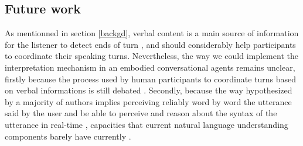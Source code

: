 \subsection{Future work}

As mentionned in section \ref{backgd}, verbal content is a main source of information for the listener to detect ends of turn \cite{de_ruiter_projecting_2006}, and should considerably help participants to coordinate their speaking turns. Nevertheless, the way we could implement the interpretation mechanism in an embodied conversational agents remains unclear, firstly because the process used by human participants to coordinate turns based on verbal informations is still debated \citep{heldner_pauses_2010,magyari_prediction_2012,riest_anticipation_2015}. Secondly, because the way hypothesized by a majority of authors implies perceiving reliably word by word the utterance said by the user and be able to perceive and reason about the syntax of the utterance in real-time \citep{sacks_simplest_1974}, capacities that current natural language understanding components barely have currently  \cite{de_vault_incremental_2011}.


